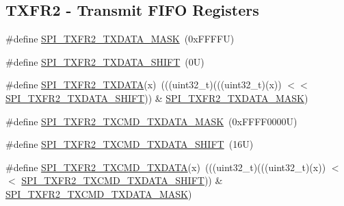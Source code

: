 \subsection*{T\+X\+F\+R2 -\/ Transmit F\+I\+FO Registers}
\begin{DoxyCompactItemize}
\item 
\#define \mbox{\hyperlink{group___s_p_i___register___masks_ga5af82cbc997e329e1c914390f4a46ddf}{S\+P\+I\+\_\+\+T\+X\+F\+R2\+\_\+\+T\+X\+D\+A\+T\+A\+\_\+\+M\+A\+SK}}~(0x\+F\+F\+F\+F\+U)
\item 
\#define \mbox{\hyperlink{group___s_p_i___register___masks_ga563b2a2513ee7f9ba76d56405bfaa053}{S\+P\+I\+\_\+\+T\+X\+F\+R2\+\_\+\+T\+X\+D\+A\+T\+A\+\_\+\+S\+H\+I\+FT}}~(0\+U)
\item 
\#define \mbox{\hyperlink{group___s_p_i___register___masks_ga250949668a77db2805371541e9bb8e16}{S\+P\+I\+\_\+\+T\+X\+F\+R2\+\_\+\+T\+X\+D\+A\+TA}}(x)~(((uint32\+\_\+t)(((uint32\+\_\+t)(x)) $<$$<$ \mbox{\hyperlink{group___s_p_i___register___masks_ga563b2a2513ee7f9ba76d56405bfaa053}{S\+P\+I\+\_\+\+T\+X\+F\+R2\+\_\+\+T\+X\+D\+A\+T\+A\+\_\+\+S\+H\+I\+FT}})) \& \mbox{\hyperlink{group___s_p_i___register___masks_ga5af82cbc997e329e1c914390f4a46ddf}{S\+P\+I\+\_\+\+T\+X\+F\+R2\+\_\+\+T\+X\+D\+A\+T\+A\+\_\+\+M\+A\+SK}})
\item 
\#define \mbox{\hyperlink{group___s_p_i___register___masks_ga7b74d7b06c2d79ce4f3f5171e63a66f6}{S\+P\+I\+\_\+\+T\+X\+F\+R2\+\_\+\+T\+X\+C\+M\+D\+\_\+\+T\+X\+D\+A\+T\+A\+\_\+\+M\+A\+SK}}~(0x\+F\+F\+F\+F0000\+U)
\item 
\#define \mbox{\hyperlink{group___s_p_i___register___masks_ga8093c55dfe44be309ef0286209361f0e}{S\+P\+I\+\_\+\+T\+X\+F\+R2\+\_\+\+T\+X\+C\+M\+D\+\_\+\+T\+X\+D\+A\+T\+A\+\_\+\+S\+H\+I\+FT}}~(16\+U)
\item 
\#define \mbox{\hyperlink{group___s_p_i___register___masks_ga75b102ae2a2b880227933ea731c97323}{S\+P\+I\+\_\+\+T\+X\+F\+R2\+\_\+\+T\+X\+C\+M\+D\+\_\+\+T\+X\+D\+A\+TA}}(x)~(((uint32\+\_\+t)(((uint32\+\_\+t)(x)) $<$$<$ \mbox{\hyperlink{group___s_p_i___register___masks_ga8093c55dfe44be309ef0286209361f0e}{S\+P\+I\+\_\+\+T\+X\+F\+R2\+\_\+\+T\+X\+C\+M\+D\+\_\+\+T\+X\+D\+A\+T\+A\+\_\+\+S\+H\+I\+FT}})) \& \mbox{\hyperlink{group___s_p_i___register___masks_ga7b74d7b06c2d79ce4f3f5171e63a66f6}{S\+P\+I\+\_\+\+T\+X\+F\+R2\+\_\+\+T\+X\+C\+M\+D\+\_\+\+T\+X\+D\+A\+T\+A\+\_\+\+M\+A\+SK}})
\end{DoxyCompactItemize}
